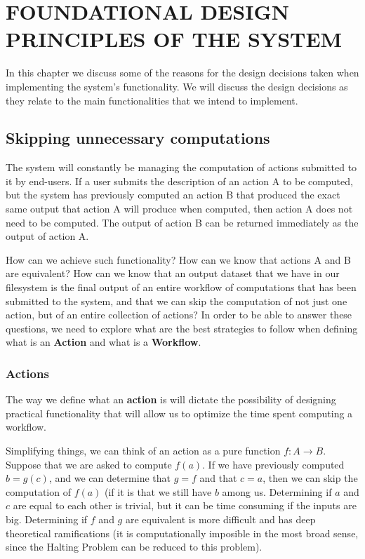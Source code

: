 \chapter{FOUNDATIONAL DESIGN PRINCIPLES OF THE SYSTEM}
\label{chap:foundational}
In this chapter we discuss some of the reasons for the design decisions taken when implementing the system's functionality.  We will discuss the design decisions as they relate to the main functionalities that we intend to implement.
\section{Skipping unnecessary computations}

The system will constantly be managing the computation of actions submitted to it by end-users. If a user submits the description of an action A to be computed, but the system has previously computed an action B that produced the exact same output that action A will produce when computed, then action A does not need to be computed.  The output of action B can be returned immediately as the output of action A.  

How can we achieve such functionality? How can we know that actions A and B are equivalent? How can we know that an output dataset that we have in our filesystem is the final output of an entire workflow of computations that has been submitted to the system, and that we can skip the computation of not just one action, but of an entire collection of actions?  In order to be able to answer these questions, we need to explore what are the best strategies to follow when defining what is an \textbf{Action} and what is a \textbf{Workflow}.

\subsection{Actions}

The way we define what an \textbf{action} is will dictate the possibility of designing practical functionality that will allow us to optimize the time spent computing a workflow. 

Simplifying things, we can think of an action as a pure function $f:A \rightarrow B$.  Suppose that we are asked to compute $f(a)$.  If we have previously computed $b=g(c)$, and we can determine that $g=f$ and that $c=a$, then we can skip the computation of $f(a)$ (if it is that we still have $b$ among us.  Determining if $a$ and $c$ are equal to each other is trivial, but it can be time consuming if the inputs are big.  Determining if $f$ and $g$ are equivalent is more difficult and has deep theoretical ramifications (it is computationally imposible in the most broad sense, since the Halting Problem can be reduced to this problem).

